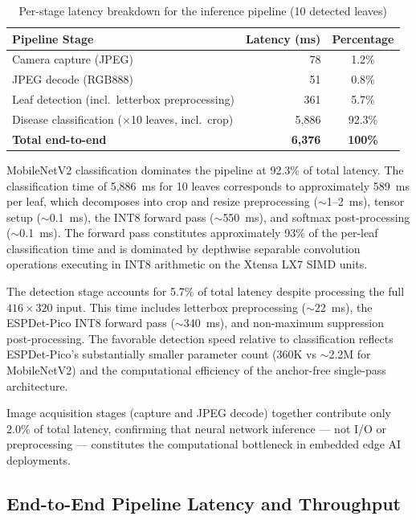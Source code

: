 \begin{table}[htbp]
\centering
\caption{Per-stage latency breakdown for the inference pipeline (10 detected leaves)}
\label{tab:per_stage_latency}
\begin{tabular}{lrc}
\toprule
\textbf{Pipeline Stage} & \textbf{Latency (ms)} & \textbf{Percentage} \\
\midrule
Camera capture (JPEG)                                    & 78     & 1.2\%   \\
JPEG decode (RGB888)                                     & 51     & 0.8\%   \\
Leaf detection (incl.\ letterbox preprocessing)           & 361    & 5.7\%   \\
Disease classification ($\times$10 leaves, incl.\ crop)   & 5,886  & 92.3\%  \\
\midrule
\textbf{Total end-to-end}                                  & \textbf{6,376}  & \textbf{100\%} \\
\bottomrule
\end{tabular}
\end{table}

MobileNetV2 classification dominates the pipeline at 92.3\% of total latency. The classification time of 5,886~ms for 10 leaves corresponds to approximately 589~ms per leaf, which decomposes into crop and resize preprocessing ($\sim$1--2~ms), tensor setup ($\sim$0.1~ms), the INT8 forward pass ($\sim$550~ms), and softmax post-processing ($\sim$0.1~ms). The forward pass constitutes approximately 93\% of the per-leaf classification time and is dominated by depthwise separable convolution operations executing in INT8 arithmetic on the Xtensa LX7 SIMD units.

The detection stage accounts for 5.7\% of total latency despite processing the full $416 \times 320$ input. This time includes letterbox preprocessing ($\sim$22~ms), the ESPDet-Pico INT8 forward pass ($\sim$340~ms), and non-maximum suppression post-processing. The favorable detection speed relative to classification reflects ESPDet-Pico's substantially smaller parameter count (360K vs $\sim$2.2M for MobileNetV2) and the computational efficiency of the anchor-free single-pass architecture.

Image acquisition stages (capture and JPEG decode) together contribute only 2.0\% of total latency, confirming that neural network inference --- not I/O or preprocessing --- constitutes the computational bottleneck in embedded edge AI deployments.

\subsection*{End-to-End Pipeline Latency and Throughput}
\label{subsec:e2e_latency}

